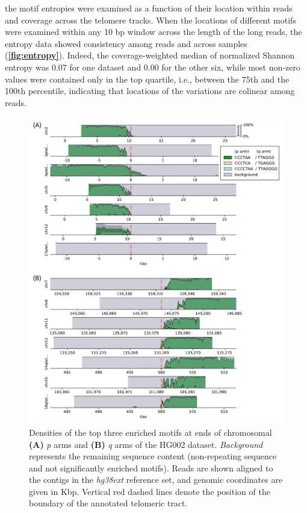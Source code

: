 \documentclass{article}
\begin{document}
            the motif entropies were examined as a function of their location within reads and coverage across the telomere tracks.
        When the locations of different motifs were examined within any 10 bp window across the length of the long reads,
            the entropy data showed consistency among reads and across samples (\textbf{\autoref{fig:entropy}}).
        Indeed, the coverage-weighted median of normalized Shannon entropy was 0.07 for one dataset and 0.00 for the other six,
            while most non-zero values were contained only in the top quartile,
            i.e., between the 75th and the 100th percentile,
            indicating that locations of the variations are colinear among reads.
        \begin{figure}[h!] \centering
        \includegraphics[height=.88\textheight,width=\textwidth,keepaspectratio]{../figures/Figure_2.pdf}
        \caption{
             \small Densities of the top three enriched motifs at ends of chromosomal \textbf{(A)} \textit{p} arms
             and \textbf{(B)} \textit{q} arms of the HG002 dataset.
             \textit{Background} represents the remaining sequence content (non-repeating sequence and not significantly enriched motifs).
             Reads are shown aligned to the contigs in the \textit{hg38ext} reference set, and genomic coordinates are given in Kbp.
             Vertical red dashed lines denote the position of the boundary of the annotated telomeric tract.
        }
        \label{fig:hg002_densityplot}
        \end{figure}
\end{document}
